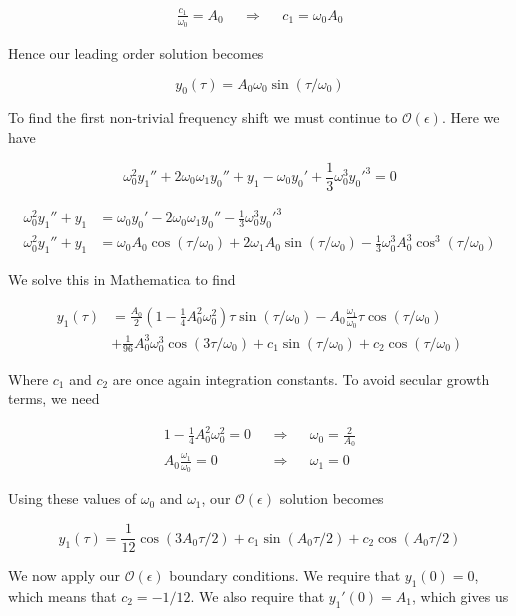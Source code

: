 \documentclass[12pt, a4paper]{article}
\begin{document}
\begin{enumerate}
\begin{enumerate}
    \begin{align*}
        \frac{c_1}{\omega_0} = A_0 && \Rightarrow && c_1 = \omega_0 A_0
    \end{align*}

    Hence our leading order solution becomes

    $$y_0(\tau) = A_0 \omega_0 \sin(\tau/\omega_0)$$

    To find the first non-trivial frequency shift we must continue to $\mathcal{O}(\epsilon)$. Here we have

    $$\omega_0^2 y_1'' + 2 \omega_0 \omega_1 y_0'' + y_1 - \omega_0y_0' + \frac{1}{3} \omega_0^3 {y_0'}^3 = 0$$

    \begin{align*}
        \omega_0^2 y_1'' + y_1 &= \omega_0y_0' - 2 \omega_0\omega_1 y_0'' - \frac{1}{3} \omega_0^3 {y_0'}^3 \\
        \omega_0^2 y_1'' + y_1 &= \omega_0 A_0\cos(\tau/\omega_0) + 2  \omega_1 A_0 \sin(\tau/\omega_0) - \frac{1}{3} \omega_0^3 A_0^3 \cos^3(\tau/\omega_0)
    \end{align*}

    We solve this in Mathematica to find

    \begin{align*}
        y_1(\tau) &=  \frac{A_0}{2}\left( 1  - \frac{1}{4} A_0^2 \omega_0^2 \right) \tau \sin (\tau/\omega_0) - A_0 \frac{\omega_1}{\omega_0} \tau \cos(\tau/\omega_0) \\
        &+ \frac{1}{96} A_0^3 \omega_0^3 \cos(3 \tau/\omega_0) + c_1 \sin(\tau/\omega_0) + c_2\cos(\tau/\omega_0)
    \end{align*}

    Where $c_1$ and $c_2$ are once again integration constants. To avoid secular growth terms, we need

    \begin{align*}
        1  - \frac{1}{4} A_0^2 \omega_0^2 = 0 && \Rightarrow && \omega_0 = \frac{2}{A_0} \\
        A_0 \frac{\omega_1}{\omega_0} = 0 && \Rightarrow && \omega_1 = 0
    \end{align*}

    Using these values of $\omega_0$ and $\omega_1$, our $\mathcal{O}(\epsilon)$ solution becomes

    $$y_1(\tau) = \frac{1}{12} \cos(3 A_0 \tau / 2) + c_1 \sin(A_0 \tau / 2) + c_2 \cos(A_0 \tau / 2)$$

    We now apply our $\mathcal{O}(\epsilon)$ boundary conditions. We require that $y_1(0)=0$, which means that $c_2 = -1/12$. We also require that $y_1'(0) = A_1$, which gives us


\end{enumerate}
\end{enumerate}
\end{document}
